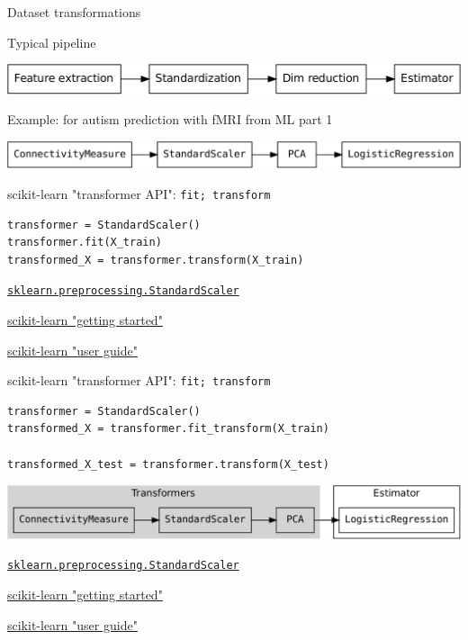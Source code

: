 \documentclass[presentation,mathserif,table]{beamer}
\begin{document}
\begin{frame}[label={sec:orgd1b4313}]{Dataset transformations}
\begin{block}{Typical pipeline}
\begin{center}
\includegraphics[width=.9\linewidth]{pipeline.pdf}
\end{center}
\end{block}

\begin{block}{Example: for autism prediction with fMRI from ML part 1}
\begin{center}
\includegraphics[width=.9\linewidth]{pipeline_example.pdf}
\end{center}
\end{block}
\end{frame}
\begin{frame}[label={sec:org1a5c7de},fragile]{scikit-learn "transformer API": \texttt{fit; transform}}
 \begin{verbatim}
transformer = StandardScaler()
transformer.fit(X_train)
transformed_X = transformer.transform(X_train)
\end{verbatim}
\vfill
\href{https://scikit-learn.org/stable/modules/generated/sklearn.preprocessing.StandardScaler.html\#sklearn.preprocessing.StandardScaler}{\texttt{sklearn.preprocessing.StandardScaler}}

\href{https://scikit-learn.org/stable/getting\_started.html\#transformers-and-pre-processors}{scikit-learn "getting started"}

\href{https://scikit-learn.org/stable/data\_transforms.html}{scikit-learn "user guide"}
\end{frame}
\begin{frame}[label={sec:orgba75fbb},fragile]{scikit-learn "transformer API": \texttt{fit; transform}}
 \begin{verbatim}
transformer = StandardScaler()
transformed_X = transformer.fit_transform(X_train)

transformed_X_test = transformer.transform(X_test)
\end{verbatim}
\vfill
\begin{center}
\includegraphics[width=.9\linewidth]{pipeline_transformer_estimator.pdf}
\end{center}

\href{https://scikit-learn.org/stable/modules/generated/sklearn.preprocessing.StandardScaler.html\#sklearn.preprocessing.StandardScaler}{\texttt{sklearn.preprocessing.StandardScaler}}

\href{https://scikit-learn.org/stable/getting\_started.html\#transformers-and-pre-processors}{scikit-learn "getting started"}

\href{https://scikit-learn.org/stable/data\_transforms.html}{scikit-learn "user guide"}
\end{frame}
\end{document}
